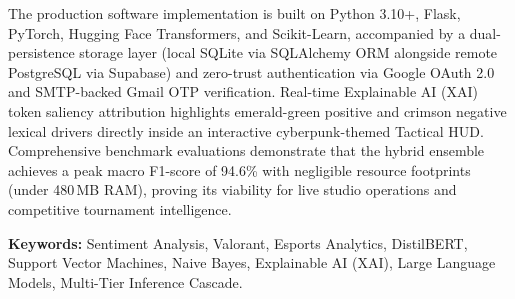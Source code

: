 \vspace{0.4cm}
\noindent The production software implementation is built on Python 3.10+, Flask, PyTorch, Hugging Face Transformers, and Scikit-Learn, accompanied by a dual-persistence storage layer (local SQLite via SQLAlchemy ORM alongside remote PostgreSQL via Supabase) and zero-trust authentication via Google OAuth 2.0 and SMTP-backed Gmail OTP verification. Real-time Explainable AI (XAI) token saliency attribution highlights emerald-green positive and crimson negative lexical drivers directly inside an interactive cyberpunk-themed Tactical HUD. Comprehensive benchmark evaluations demonstrate that the hybrid ensemble achieves a peak macro F1-score of 94.6\% with negligible resource footprints (under 480\,MB RAM), proving its viability for live studio operations and competitive tournament intelligence.

\vspace{0.8cm}
\noindent \textbf{Keywords:} Sentiment Analysis, Valorant, Esports Analytics, DistilBERT, Support Vector Machines, Naive Bayes, Explainable AI (XAI), Large Language Models, Multi-Tier Inference Cascade.

\newpage
\tableofcontents

\newpage
\listoffigures

\newpage
\listoftables
